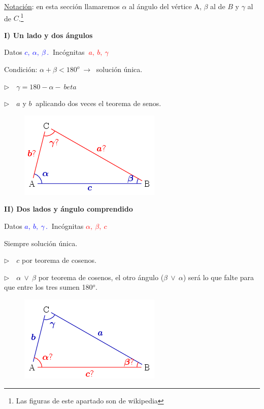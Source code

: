 \underline{Notación}: en esta sección llamaremos $\alpha$ al ángulo del vértice A, $\beta$ al de $B$ y $\gamma$ al de $C$.\footnote{ Las figuras de este apartado son de wikipedia}


\vspace{0.3cm}
\begin{multicols}{2}

	\textbf{I) Un lado y dos ángulos}
	
	Datos \textcolor{blue}{$c, \ \alpha, \ \beta\, . \ $} Incógnitas \textcolor{red}{$\ a,\ b,\ \gamma$}
	
	Condición: $\alpha+\beta<180^o \ \to \ $ solución única.
	
	$\triangleright \quad  \gamma=180-\alpha-\ beta$
	
	$\triangleright \quad  a \text{ y } b \ $ aplicando dos veces el teorema de senos.
	
	\begin{figure}[H]
		\centering
		\includegraphics[width=.45\textwidth]{img-triang/RTC1.png}
	\end{figure}	
\end{multicols}


\vspace{0.3cm}
\begin{multicols}{2}
\textbf{II) Dos lados y ángulo comprendido}

Datos \textcolor{blue}{$a,\ b,\ \gamma\, . \ $} Incógnitas \textcolor{red}{$\alpha, \ \beta, \ c$}

Siempre solución única.

$\triangleright \quad c$ por teorema de cosenos.

$\triangleright \quad \alpha \ \vee \ \beta$ por teorema de cosenos, el otro ángulo ($\beta \ \vee  \ \alpha$) será lo que falte para que entre los tres sumen 180$^o$.
\begin{figure}[H]
	\centering
	\includegraphics[width=.45\textwidth]{img-triang/RTC2.png}
\end{figure}	
\end{multicols}



